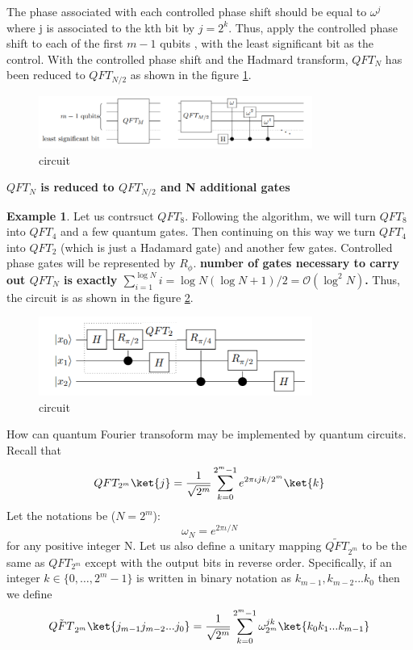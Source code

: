 \documentclass[12pt, oneside]{book}
\theoremstyle{definition}
\theoremstyle{definition}
\newtheorem{example}{Example}[section]
\theoremstyle{remark}
\begin{document}
The phase associated with each controlled phase shift should be equal to $\omega^j$ where j is associated to the kth bit by $j=2^k$.
Thus, apply the controlled phase shift to each of the first $m-1$ qubits , with the least significant bit as the control. 
With the controlled phase shift and the Hadmard transform, $QFT_N$ has been reduced to $QFT_{N/2}$ as shown in the figure \ref{fig:qft_2}.
\begin{figure}[H]
    \centering
    \includegraphics[width=0.8\textwidth]{../images/qft_2.png}
    \caption{circuit}
    \label{fig:qft_2}
\end{figure}

\textbf{$QFT_N$ is reduced to $QFT_{N/2}$ and N additional gates}

\begin{example}
    Let us contrsuct $QFT_8$. Following the algorithm, we will turn $QFT_8$ into $QFT_4$ 
    and a few quantum gates. Then continuing on this way we turn $QFT_4$ into $QFT_2$ (which is just a Hadamard gate) and another few gates.
    Controlled phase gates will be represented by $R_{\phi}$.
    \textbf{number of gates necessary to carry out $QFT_N$ is exactly $\sum_{i=1}^{\log N}i=\log N(\log N+1)/2=\mathcal{O}(\log^2 N)$.}
    Thus, the circuit is as shown in the figure \ref{fig:QFT}.
    \begin{figure}[H]
        \centering
        \includegraphics[width=0.8\textwidth]{../images/QFT.png}
        \caption{circuit}
        \label{fig:QFT}
    \end{figure}
\end{example}

How can quantum Fourier transoform may be implemented by quantum circuits.
Recall that 
\[
QFT_{2^m}\ket{j}=\frac{1}{\sqrt{2^m}}\sum_{k=0}^{2^m-1}e^{2\pi \iota jk/2^m}\ket{k}
\]
Let the notations be ($N=2^m$):
\[\omega_N=e^{2\pi\iota/N}
\]
for any positive integer N. Let us also define a unitary mapping $\tilde{QFT}_{2^m}$ to be the same as 
$QFT_{2^m}$ except with the output bits in reverse order. Specifically, if an integer $k \in \{0,\ldots,2^m-1\}$ is written in binary notation as $k_{m-1},k_{m-2}...k_0$ then we define
\[
\tilde{QFT}_{2^m}\ket{j_{m-1}j_{m-2}...j_0}=\frac{1}{\sqrt{2^m}}\sum_{k=0}^{2^m-1} \omega_{2^m}^{jk}\ket{k_0k_1...k_{m-1}}
\]
\end{document}
